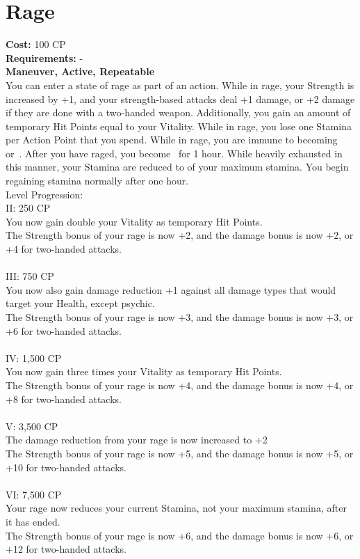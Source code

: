 \section{Rage}\label{perk:rage}
\textbf{Cost:} 100 CP\\
\textbf{Requirements:} -\\
\textbf{Maneuver, Active, Repeatable}\\
You can enter a state of rage as part of an action.
While in rage, your Strength is increased by +1, and your strength-based attacks deal +1 damage, or +2 damage if they are done with a two-handed weapon.
Additionally, you gain an amount of temporary Hit Points equal to your Vitality.
While in rage, you lose one Stamina per Action Point that you spend.
While in rage, you are immune to becoming~ or~.
After you have raged, you become~ for 1 hour.
While heavily exhausted in this manner, your Stamina are reduced to  of your maximum stamina.
You begin regaining stamina normally after one hour.
\\
Level Progression:\\
II: 250 CP\\
You now gain double your Vitality as temporary Hit Points.\\
The Strength bonus of your rage is now +2, and the damage bonus is now +2, or +4 for two-handed attacks.\\
\\
III: 750 CP\\
You now also gain damage reduction +1 against all damage types that would target your Health, except psychic.\\
The Strength bonus of your rage is now +3, and the damage bonus is now +3, or +6 for two-handed attacks.\\
\\
IV: 1,500 CP\\
You now gain three times your Vitality as temporary Hit Points.\\
The Strength bonus of your rage is now +4, and the damage bonus is now +4, or +8 for two-handed attacks.\\
\\
V: 3,500 CP\\
The damage reduction from your rage is now increased to +2\\
The Strength bonus of your rage is now +5, and the damage bonus is now +5, or +10 for two-handed attacks.\\
\\
VI: 7,500 CP\\
Your rage now reduces your current Stamina, not your maximum stamina, after it has ended.\\
The Strength bonus of your rage is now +6, and the damage bonus is now +6, or +12 for two-handed attacks.\\
\\